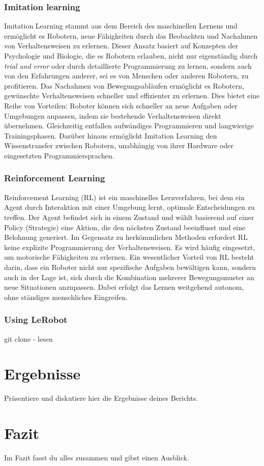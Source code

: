 \documentclass[a4paper, 12pt]{article}
\begin{document}
\subsubsection{Imitation learning} \label{imitation_learning}
Imitation Learning stammt aus dem Bereich des maschinellen Lernens und ermöglicht es  Robotern, neue Fähigkeiten durch das Beobachten und Nachahmen von Verhaltensweisen zu erlernen. Dieser Ansatz basiert auf Konzepten der Psychologie und Biologie, die es Robotern erlauben, nicht nur eigenständig durch \textit{trial and error} oder durch detaillierte Programmierung zu lernen, sondern auch von den Erfahrungen anderer, sei es von Menschen oder anderen Robotern, zu profitieren.
Das Nachahmen von Bewegungsabläufen ermöglicht es Robotern, gewünschte Verhaltensweisen schneller und effizienter zu erlernen. Dies bietet eine Reihe von Vorteilen: Roboter können sich schneller an neue Aufgaben oder Umgebungen anpassen, indem sie bestehende Verhaltensweisen direkt übernehmen. Gleichzeitig entfallen aufwändiges Programmieren und langwierige Trainingsphasen. Darüber hinaus ermöglicht Imitation Learning den Wissenstransfer zwischen Robotern, unabhängig von ihrer Hardware oder eingesetzten Programmiersprachen. \cite{robot_imitating}

\subsubsection{Reinforcement Learning} \label{reinforcement_learning}
Reinforcement Learning (RL) ist ein maschinelles Lernverfahren, bei dem ein Agent durch Interaktion mit einer Umgebung lernt, optimale Entscheidungen zu treffen. Der Agent befindet sich in einem Zustand und wählt basierend auf einer Policy (Strategie) eine Aktion, die den nächsten Zustand beeinflusst und eine Belohnung generiert. Im Gegensatz zu herkömmlichen Methoden erfordert RL keine explizite Programmierung der Verhaltensweisen. Es wird häufig eingesetzt, um motorische Fähigkeiten zu erlernen. Ein wesentlicher Vorteil von RL besteht darin, dass ein Roboter nicht nur spezifische Aufgaben bewältigen kann, sondern auch in der Lage ist, sich durch die Kombination mehrerer Bewegungsmuster an neue Situationen anzupassen. Dabei erfolgt das Lernen weitgehend autonom, ohne ständiges menschliches Eingreifen. \cite{learning_motor_skills}

\subsubsection{Using LeRobot} \label{using_lerobot}
git clone
- lesen

\newpage
\section{Ergebnisse}
Präsentiere und diskutiere hier die Ergebnisse deines Berichts.

\newpage
\section{Fazit}
Im Fazit fasst du alles zusammen und gibst einen Ausblick.

\newpage


\end{document}
